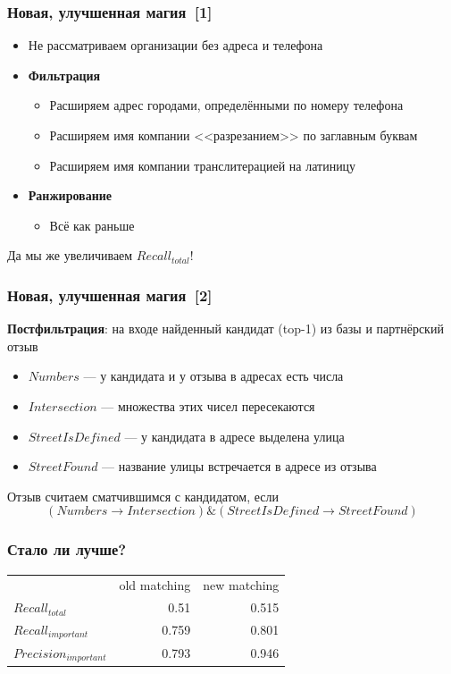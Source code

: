 \documentclass{beamer}
\begin{document}
\begin{frame}\frametitle{Новая, улучшенная магия~[1]}
	\begin{itemize}
                \item Не рассматриваем организации без адреса и телефона
		\item \textbf{Фильтрация}
		\begin{itemize}
			\item Расширяем адрес городами, определёнными по номеру телефона
                        \item Расширяем имя компании <<разрезанием>> по заглавным буквам
                        \item Расширяем имя компании транслитерацией на латиницу
                \end{itemize}
		\item \textbf{Ранжирование}
		\begin{itemize}
			\item Всё как раньше
                \end{itemize}
	\end{itemize}
	Да мы же увеличиваем $Recall_{total}$!
\end{frame}

\begin{frame}\frametitle{Новая, улучшенная магия~[2]}
	\textbf{Постфильтрация}: на входе найденный кандидат (top-1) из базы и партнёрский отзыв
	\begin{itemize}
		\item $Numbers$ --- у кандидата и у отзыва в адресах есть числа
		\item $Intersection$ --- множества этих чисел пересекаются
		\item $StreetIsDefined$ --- у кандидата в адресе выделена улица
		\item $StreetFound$ --- название улицы встречается в адресе из отзыва
        \end{itemize}	
	Отзыв считаем сматчившимся с кандидатом, если $$(Numbers \rightarrow Intersection) \& (StreetIsDefined \rightarrow StreetFound)$$
\end{frame}

\begin{frame}\frametitle{Стало ли лучше?}
	\begin{tabularx}{\textwidth}{lrr}
                                  & old matching  & new matching \\[5pt] 
	  $Recall_{total}$        & 0.51          & 0.515 \\[5pt] 
	  $Recall_{important}$    & 0.759         & 0.801\\[5pt] 
	  $Precision_{important}$ & 0.793         & 0.946\\[5pt] 
	\end{tabularx}
\end{frame}
\end{document}
